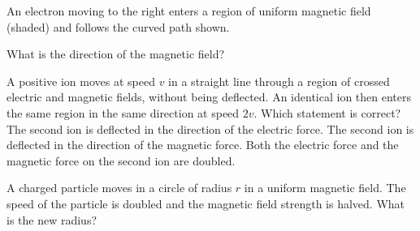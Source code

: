 \begin{quizq}{}
An electron moving to the right enters a region of uniform magnetic field (shaded) and follows the
curved path shown.
\begin{center}
\end{center}
What is the direction of the magnetic field?
\end{quizq}

\begin{quizq}{}
A positive ion moves at speed $v$ in a straight line through a region of crossed electric and magnetic
fields, without being deflected. An identical ion then enters the same region in the same direction at
speed $2v$. Which statement is correct?
  {The second ion is deflected in the direction of the electric force.}
  {The second ion is deflected in the direction of the magnetic force.}
  {Both the electric force and the magnetic force on the second ion are doubled.}
\end{quizq}

\begin{quizq}{}
A charged particle moves in a circle of radius $r$ in a uniform magnetic field. The speed of the
particle is doubled and the magnetic field strength is halved. What is the new radius?
\end{quizq}

